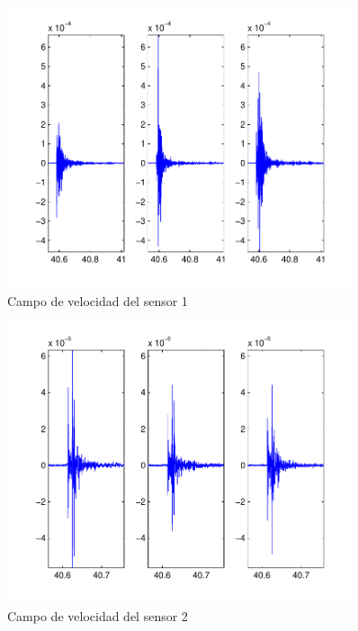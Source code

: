  \begin{figure}[H]
\includegraphics[width=0.9\textwidth,height=0.4\textheight]{linea_timerev/figuras/plotSensor(Ev(1),1).pdf}
\caption{Campo de velocidad del sensor 1}
\end{figure}
\begin{figure}[H]
\includegraphics[width=0.9\textwidth,height=0.4\textheight]{linea_timerev/figuras/plotSensor(Ev(1),2).pdf}
\caption{Campo de velocidad del sensor 2}
\end{figure}
